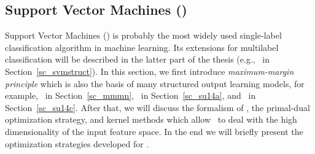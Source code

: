 {\iffalse
The key is to introduce a set of tighter upper bounds on (\ref{lr_posteriori_log}) that are parameterized by $\valpha$.
The bounds should have a simple form such that the maximizing (\ref{lr_posteriori_log}) over $\vw$ can be solved analytically with $\alpha$.
The solution to the original problem is transferred as finding the tighter upper bounds for  $\vw$, which is to minimize with respect to $\alpha$.

Later on, optimization algorithms that are based on dual form have been developed, for example iterative optimization method \citep{Keerthi05a} and the dual coordinate descent method \citep{Yu11dual}.
\fi


%
% 
\subsection{Support Vector Machines (\svm)}	\label{sc_svm}

Support Vector Machines (\svm) is probably the most widely used single-label classification algorithm in machine learning.
Its extensions for multilabel classification will be described in the latter part of the thesis (e.g., \svmstruct\ in Section~\ref{sc_svmstruct}).
In this section, we first introduce \textit{maximum-margin principle} which is also the basis of many structured output learning models, for example,  \mmmn\ in Section~\ref{sc_mmmn}, \spin\ in Section~\ref{sc_su14a}, and \rta\ in Section~\ref{sc_su14c}.
After that, we will discuss the formalism of \svm, the primal-dual optimization strategy, and kernel methods which allow \svm\ to deal with the high dimensionality of the input feature space.
In the end we will briefly present the optimization strategies developed for \svm.

}
